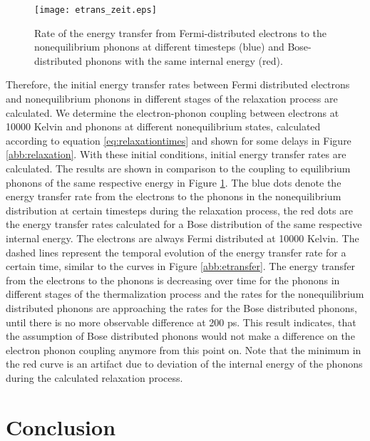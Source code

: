 \documentclass[ aps, prb, reprint, groupedaddress]{revtex4-1}
\begin{document}
\begin{figure}[!h]
\texttt{[image: etrans\_zeit.eps]} %
\caption{Rate of the energy transfer from Fermi-distributed electrons to the nonequilibrium phonons at different timesteps (blue) and Bose-distributed phonons with the same internal energy (red).}
\label{abb:etrans_z}
\end{figure}

Therefore, the initial energy transfer rates between Fermi distributed electrons and nonequilibrium phonons in different stages of the relaxation process are calculated. We determine the electron-phonon coupling 
between electrons at 10000 Kelvin and phonons at different nonequilibrium states, calculated according to equation \eqref{eq:relaxationtimes} and shown for some delays in Figure \ref{abb:relaxation}. With these 
initial conditions, initial energy transfer rates are calculated. The results are shown in comparison to the coupling to equilibrium phonons of the same respective energy in Figure \ref{abb:etrans_z}.
The blue dots denote the energy transfer rate from the electrons to the phonons in the nonequilibrium distribution at certain timesteps during the relaxation process,
the red dots are the energy 
transfer rates
calculated for 
a Bose distribution of the same respective internal energy. The electrons are always Fermi distributed at 10000 Kelvin. The dashed lines represent the temporal evolution of the energy transfer rate for a 
certain time, similar to the curves in
Figure \ref{abb:etransfer}.
The energy transfer from the electrons to the phonons is decreasing over time for the phonons in different 
stages of the thermalization process and the rates for the nonequilibrium distributed phonons are approaching the rates for the Bose distributed phonons, until there is no more observable difference at 200 ps.
This result indicates, that the assumption of Bose distributed phonons would not make a difference on the electron phonon coupling anymore from this point on.
Note that the minimum in the red curve is an artifact due to deviation of the internal energy of the phonons during the calculated relaxation process.
















\section{Conclusion} 
\end{document}
